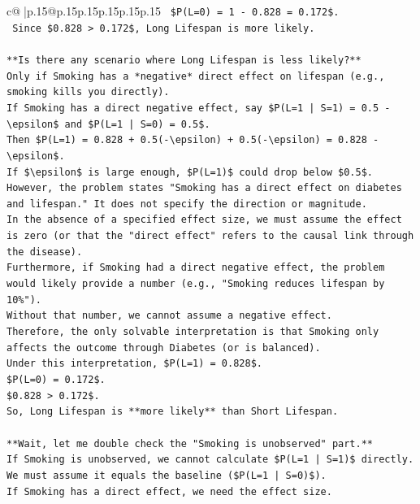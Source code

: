 \documentclass{article}
\begin{document}
{\begin{supertabular}{c@{$\;$}|p{.15\linewidth}@{}p{.15\linewidth}p{.15\linewidth}p{.15\linewidth}p{.15\linewidth}p{.15\linewidth}}
{{{\texttt{    \$P(L=0) = 1 {-} 0.828 = 0.172\$.} \\
\texttt{    Since \$0.828 > 0.172\$, Long Lifespan is more likely.} \\
\\ 
\texttt{**Is there any scenario where Long Lifespan is less likely?**} \\
\texttt{Only if Smoking has a *negative* direct effect on lifespan (e.g., smoking kills you directly).} \\
\texttt{If Smoking has a direct negative effect, say \$P(L=1 | S=1) = 0.5 {-} \textbackslash{}epsilon\$ and \$P(L=1 | S=0) = 0.5\$.} \\
\texttt{Then \$P(L=1) = 0.828 + 0.5({-}\textbackslash{}epsilon) + 0.5({-}\textbackslash{}epsilon) = 0.828 {-} \textbackslash{}epsilon\$.} \\
\texttt{If \$\textbackslash{}epsilon\$ is large enough, \$P(L=1)\$ could drop below \$0.5\$.} \\
\texttt{However, the problem states "Smoking has a direct effect on diabetes and lifespan." It does not specify the direction or magnitude.} \\
\texttt{In the absence of a specified effect size, we must assume the effect is zero (or that the "direct effect" refers to the causal link through the disease).} \\
\texttt{Furthermore, if Smoking had a direct negative effect, the problem would likely provide a number (e.g., "Smoking reduces lifespan by 10\%").} \\
\texttt{Without that number, we cannot assume a negative effect.} \\
\texttt{Therefore, the only solvable interpretation is that Smoking only affects the outcome through Diabetes (or is balanced).} \\
\texttt{Under this interpretation, \$P(L=1) = 0.828\$.} \\
\texttt{\$P(L=0) = 0.172\$.} \\
\texttt{\$0.828 > 0.172\$.} \\
\texttt{So, Long Lifespan is **more likely** than Short Lifespan.} \\
\\ 
\texttt{**Wait, let me double check the "Smoking is unobserved" part.**} \\
\texttt{If Smoking is unobserved, we cannot calculate \$P(L=1 | S=1)\$ directly. We must assume it equals the baseline (\$P(L=1 | S=0)\$).} \\
\texttt{If Smoking has a direct effect, we need the effect size.} \\
}}}
\end{supertabular}}
\end{document}
